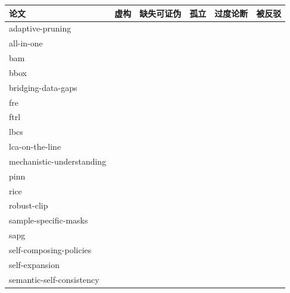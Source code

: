 \documentclass[
]{article}
\newcommand{\cmark}{\textcolor{green!60!black}{\ding{51}}}
\newcommand{\xmark}{\textcolor{red!70!black}{\ding{55}}}
\theoremstyle{definition}
\begin{document}
\begin{table}[t]
\centering
\small
\begin{tabular}{l | c c c c c}
\toprule
\textbf{论文} & \textbf{虚构} & \textbf{缺失可证伪} & \textbf{孤立} & \textbf{过度论断} & \textbf{被反驳} \\
\midrule
adaptive-pruning                           & \cmark & \cmark & \cmark & \cmark & \cmark \\
all-in-one                                 & \cmark & \cmark & \cmark & \cmark & \cmark \\
bam                                        & \cmark & \xmark & \cmark & \cmark & \cmark \\
bbox                                       & \cmark & \xmark & \xmark & \cmark & \cmark \\
bridging-data-gaps                         & \cmark & \cmark & \xmark & \cmark & \cmark \\
fre                                        & \cmark & \cmark & \xmark & \cmark & \cmark \\
ftrl                                       & \cmark & \cmark & \xmark & \cmark & \cmark \\
lbcs                                       & \cmark & \cmark & \xmark & \cmark & \cmark \\
lca-on-the-line                            & \cmark & \cmark & \xmark & \cmark & \cmark \\
mechanistic-understanding                  & \cmark & \cmark & \xmark & \cmark & \cmark \\
pinn                                       & \cmark & \cmark & \xmark & \cmark & \cmark \\
rice                                       & \cmark & \cmark & \xmark & \cmark & \cmark \\
robust-clip                                & \cmark & \cmark & \xmark & \cmark & \cmark \\
sample-specific-masks                      & \cmark & \cmark & \xmark & \cmark & \cmark \\
sapg                                       & \cmark & \cmark & \cmark & \cmark & \cmark \\
self-composing-policies                    & \cmark & \cmark & \xmark & \cmark & \cmark \\
self-expansion                             & \cmark & \cmark & \xmark & \cmark & \cmark \\
semantic-self-consistency                  & \cmark & \cmark & \xmark & \cmark & \cmark \\

\end{tabular}
\end{table}
\end{document}

